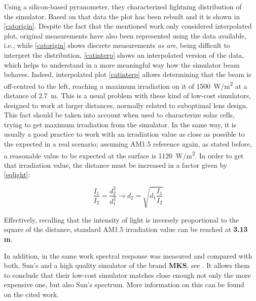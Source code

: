 			
		Using a silicon-based pyranometer, they characterized lightning distribution of the simulator. Based on that data the plot has been rebuilt and it is shown in \autoref{catorigin}. Despite the fact that the mentioned work only considered interpolated plot, original measurements have also been represented using the data available, i.e., while \autoref{catorigin} shows discrete measurements \textit{as are}, being difficult to interpret the distribution, \autoref{catinterp} shows an interpolated version of the data, which helps to understand in a more meaningful way how the simulator beam behaves. Indeed, interpolated plot \autoref{catinterp} allows determining that the beam is off-centred to the left, reaching a maximum irradiation on it of \SI{1500}{W/m^2} at a distance of 2.7~m. This is a usual problem with these kind of low-cost simulators, designed to work at larger distances, normally related to suboptimal lens design. This fact should be taken into account when used to characterize solar cells, trying to get maximum irradiation from the simulator. In the same way, it is usually a good practice to work with an irradiation value as close as possible to the expected in a real scenario; assuming \acrshort{AM}1.5 reference again, as stated before, a reasonable value to be expected at the surface is \SI{1120}{W/m^2}. In order to get that irradiation value, the distance must be increased in a factor given by \autoref{eqlight}:
	
	
	\begin{equation} 
		\frac{I_{1}}{I_{2}}=\frac{d^{2}_{2}}{d^{2}_{1}} \rightarrow d_{2} = \sqrt{d_{1}\frac{I_{1}}{I_{2}}}\label{eqlight}
	\end{equation}

	
	Effectively, recalling that the intensity of light is inversely proportional to the square of the distance, standard \acrshort{AM}1.5 irradiation value can be reached at \textbf{3.13 m}.
	
	In addition, in the same work \cite{catalan} spectral response was measured and compared with both, Sun's and a high quality simulator of the brand \textbf{MKS}, see \cite{oriel}. It allows them to conclude that their low-cost simulator matches close enough not only the more expensive one, but also Sun's spectrum. More information on this can be found on the cited work. 
	
	
